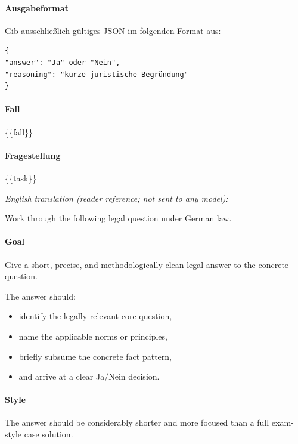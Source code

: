 \documentclass[11pt]{article}
\providecommand{\tightlist}{%
  \setlength{\itemsep}{0pt}\setlength{\parskip}{0pt}}
\begin{document}
\paragraph{Ausgabeformat}\label{ausgabeformat-1}

Gib ausschließlich gültiges JSON im folgenden Format aus:

\begin{verbatim}
{
"answer": "Ja" oder "Nein",
"reasoning": "kurze juristische Begründung"
}
\end{verbatim}

\paragraph{Fall}\label{fall}

\{\{fall\}\}

\paragraph{Fragestellung}\label{fragestellung}

\{\{task\}\}

\emph{English translation (reader reference; not sent to any model):}

Work through the following legal question under German law.

\paragraph{Goal}\label{goal}

Give a short, precise, and methodologically clean legal answer to the
concrete question.

The answer should:

\begin{itemize}
\tightlist
\item
  identify the legally relevant core question,
\item
  name the applicable norms or principles,
\item
  briefly subsume the concrete fact pattern,
\item
  and arrive at a clear Ja/Nein decision.
\end{itemize}

\paragraph{Style}\label{style}

The answer should be considerably shorter and more focused than a full
exam-style case solution.
\end{document}
